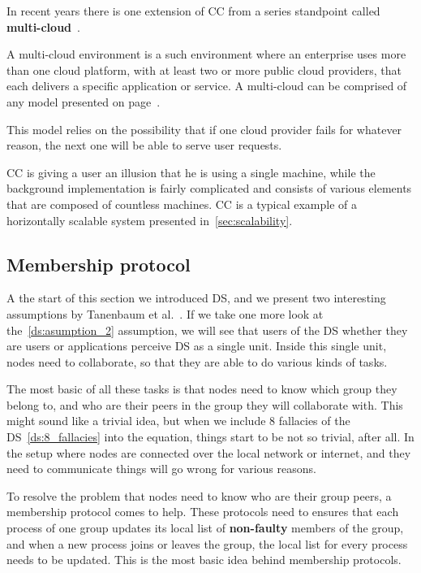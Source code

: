 In recent years there is one extension of CC from a series standpoint called \textbf{multi-cloud}~\cite{HongDSH19, Ardagna15}. 

A multi-cloud environment is a such environment where an enterprise uses more than one cloud platform, with at least two or more public cloud providers, that each delivers a specific application or service. A multi-cloud can be comprised of any model presented on page~\pageref{sec_types}.

This model relies on the possibility that if one cloud provider fails for whatever reason, the next one will be able to serve user requests.

CC is giving a user an illusion that he is using a single machine, while the background implementation is fairly complicated and consists of various elements that are composed of countless machines. CC is a typical example of a horizontally scalable system presented in~\ref{sec:scalability}.
%
%
\subsection{Membership protocol}\label{sec:memership_protocol}
%
A the start of this section we introduced DS, and we present two interesting assumptions by Tanenbaum et al.~\cite{SteenT16, 0019513}. If we take one more look at the~\ref{ds:asumption_2} assumption, we will see that users of the DS whether they are users or applications perceive DS as a single unit. Inside this single unit, nodes need to collaborate, so that they are able to do various kinds of tasks.

The most basic of all these tasks is that nodes need to know which group they belong to, and who are their peers in the group they will collaborate with. This might sound like a trivial idea, but when we include 8 fallacies of the DS~\ref{ds:8_fallacies} into the equation, things start to be not so trivial, after all. In the setup where nodes are connected over the local network or internet, and they need to communicate things will go wrong for various reasons.

To resolve the problem that nodes need to know who are their group peers, a membership protocol comes to help. These protocols need to ensures that each process of one group updates its local list of \textbf{non-faulty} members of the group, and when a new process joins or leaves the group, the local list for every process needs to be updated. This is the most basic idea behind membership protocols.

